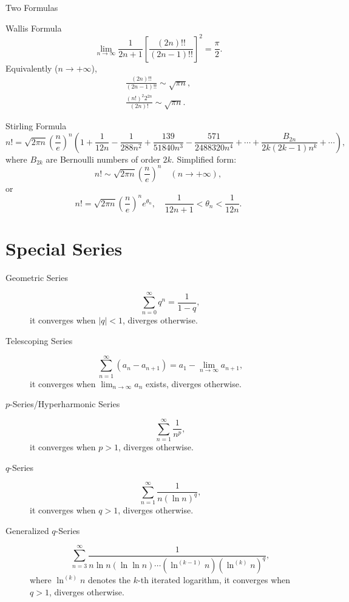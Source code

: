 \documentclass[11pt]{../../TexTemplate/elegantbook}
\begin{document}
\begin{leftbarTitle}{Two Formulas}\end{leftbarTitle}
\begin{theorem}{Wallis Formula}
    \[
    \lim_{n \to \infty} \frac{1}{2n+1} \left[ \frac{(2n)!!}{(2n-1)!!} \right]^{2}  = \frac{\pi}{2}.
    \]
    Equivalently (\(n\to +\infty\)),
    \begin{gather*}
        \frac{(2n)!!}{(2n-1)!!} \sim \sqrt{\pi n}, \\
        \frac{(n!)^{2}2^{2n}}{(2n)!} \sim \sqrt{\pi n}.
    \end{gather*}
\end{theorem}


\begin{theorem}{Stirling Formula}
    \[
    n! = \sqrt{2\pi n} \left( \frac{n}{e} \right)^n 
    \left( 1 + \frac{1}{12n} - \frac{1}{288n^2} + \frac{139}{51840n^3} - \frac{571}{2488320n^4} + \cdots 
    + \frac{B_{2n}}{2k(2k-1) n^{k}} + \cdots  \right),
    \]
    where \( B_{2k} \) are Bernoulli numbers of order \( 2k \).
    Simplified form:
    \[
    n! \sim \sqrt{2\pi n} \left( \frac{n}{e} \right)^{n} \quad (n \to +\infty),
    \]
    or
    \[
    n! = \sqrt{2\pi n} \left( \frac{n}{e} \right)^{n} e^{\theta_n}, \quad \frac{1}{12n+1} < \theta_n < \frac{1}{12n}.
    \]
\end{theorem}


\section{Special Series}
\begin{description}
    \item[Geometric Series] 
        \[
        \sum_{n=0}^{\infty} q^n = \frac{1}{1-q},
        \]
        it converges when \( |q| < 1 \), diverges otherwise.
    \item[Telescoping Series]
        \[
        \sum_{n=1}^{\infty} (a_n - a_{n+1}) = a_1 - \lim_{n \to \infty} a_{n+1},
        \]
        it converges when \( \lim_{n \to \infty} a_n \) exists, diverges otherwise.
    \item[\(p\)-Series/Hyperharmonic Series]
        \[
        \sum_{n=1}^{\infty} \frac{1}{n^p},
        \]
        it converges when \( p > 1 \), diverges otherwise.
    \item[\(q\)-Series]
        \[
        \sum_{n=1}^{\infty} \frac{1}{n (\ln n)^q},
        \]
        it converges when \( q > 1 \), diverges otherwise.
    \item[Generalized \(q\)-Series]
        \[
        \sum_{n=3}^{\infty} \frac{1}{n \ln n (\ln \ln n)\cdots (\ln^{(k-1)} n) (\ln^{(k)} n)^q},
        \]
        where \( \ln^{(k)} n \) denotes the \( k \)-th iterated logarithm,
        it converges when \( q > 1 \), diverges otherwise.        
\end{description}
\end{document}
